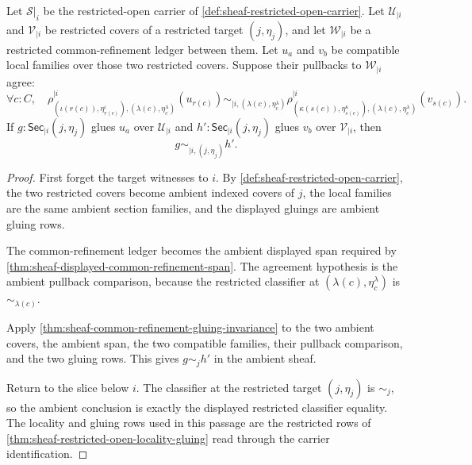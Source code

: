 \begin{theorem}
\label{thm:sheaf-restricted-common-refinement-gluing-invariance}
Let $\mathcal{S}|_i$ be the restricted-open carrier of \autoref{def:sheaf-restricted-open-carrier}. Let $\mathcal{U}_{|i}$ and $\mathcal{V}_{|i}$ be restricted covers of a restricted target $(j,\eta_j)$, and let $\mathcal{W}_{|i}$ be a restricted common-refinement ledger between them. Let $u_a$ and $v_b$ be compatible local families over those two restricted covers. Suppose their pullbacks to $\mathcal{W}_{|i}$ agree:
$$
\forall c:C,\quad
\rho^{|i}_{(\iota(r(c)),\eta^\iota_{r(c)}),(\lambda(c),\eta^\lambda_c)}(u_{r(c)})
\sim_{|i,(\lambda(c),\eta^\lambda_c)}
\rho^{|i}_{(\kappa(s(c)),\eta^\kappa_{s(c)}),(\lambda(c),\eta^\lambda_c)}(v_{s(c)}).
$$
If $g:\mathsf{Sec}_{|i}(j,\eta_j)$ glues $u_a$ over $\mathcal{U}_{|i}$ and $h':\mathsf{Sec}_{|i}(j,\eta_j)$ glues $v_b$ over $\mathcal{V}_{|i}$, then
$$
g\sim_{|i,(j,\eta_j)}h'.
$$
\end{theorem}
\begin{proof}
First forget the target witnesses to $i$. By \autoref{def:sheaf-restricted-open-carrier}, the two restricted covers become ambient indexed covers of $j$, the local families are the same ambient section families, and the displayed gluings are ambient gluing rows.

The common-refinement ledger becomes the ambient displayed span required by \autoref{thm:sheaf-displayed-common-refinement-span}. The agreement hypothesis is the ambient pullback comparison, because the restricted classifier at $(\lambda(c),\eta^\lambda_c)$ is $\sim_{\lambda(c)}$.

Apply \autoref{thm:sheaf-common-refinement-gluing-invariance} to the two ambient covers, the ambient span, the two compatible families, their pullback comparison, and the two gluing rows. This gives $g\sim_j h'$ in the ambient sheaf.

Return to the slice below $i$. The classifier at the restricted target $(j,\eta_j)$ is $\sim_j$, so the ambient conclusion is exactly the displayed restricted classifier equality. The locality and gluing rows used in this passage are the restricted rows of \autoref{thm:sheaf-restricted-open-locality-gluing} read through the carrier identification.
\end{proof}

